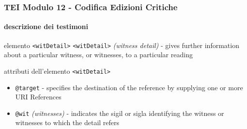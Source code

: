 \begin{frame}
    \frametitle{TEI Modulo 12 - Codifica Edizioni Critiche}
    \framesubtitle{descrizione dei testimoni}
    \addtocounter{nframe}{1}





    \begin{block}{elemento \texttt{<witDetail>}}
     \texttt{<witDetail>} \textit{(witness detail)} - gives further information about a particular witness, or witnesses, to a particular reading
    \end{block}

    \begin{block}{attributi dell'elemento \texttt{<witDetail>}}
        \begin{itemize}
            \item \texttt{@target} \textit{} - specifies the destination of the reference by supplying one or more URI References
            \item \texttt{@wit} \textit{(witnesses)} - indicates the sigil or sigla identifying the witness or witnesses to which the detail refers
        \end{itemize}

    \end{block}

\end{frame}




